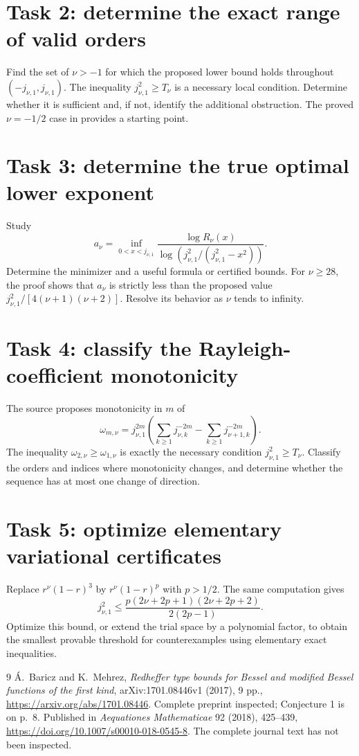 \documentclass[11pt]{article}
\begin{document}
\section*{Task 2: determine the exact range of valid orders}
Find the set of \(\nu>-1\) for which the proposed lower bound
holds throughout \((-j_{\nu,1},j_{\nu,1})\).
The inequality \(j_{\nu,1}^2\ge T_\nu\) is a necessary local condition.
Determine whether it is sufficient and, if not, identify the
additional obstruction. The proved \(\nu=-1/2\) case in \cite{BM}
provides a starting point.

\section*{Task 3: determine the true optimal lower exponent}
Study
\[
 a_\nu=\inf_{0<x<j_{\nu,1}}
 \frac{\log R_\nu(x)}
      {\log(j_{\nu,1}^2/(j_{\nu,1}^2-x^2))}.
\]
Determine the minimizer and a useful formula or certified bounds.
For \(\nu\ge28\), the proof shows that \(a_\nu\) is strictly less
than the proposed value \(j_{\nu,1}^2/[4(\nu+1)(\nu+2)]\).
Resolve its behavior as \(\nu\) tends to infinity.

\section*{Task 4: classify the Rayleigh-coefficient monotonicity}
The source proposes monotonicity in \(m\) of
\[
 \omega_{m,\nu}=j_{\nu,1}^{2m}
   \left(\sum_{k\ge1}j_{\nu,k}^{-2m}
               -\sum_{k\ge1}j_{\nu+1,k}^{-2m}\right).
\]
The inequality \(\omega_{2,\nu}\ge\omega_{1,\nu}\) is exactly the
necessary condition \(j_{\nu,1}^2\ge T_\nu\).
Classify the orders and indices where monotonicity changes, and
determine whether the sequence has at most one change of direction.

\section*{Task 5: optimize elementary variational certificates}
Replace \(r^\nu(1-r)^3\) by \(r^\nu(1-r)^p\) with \(p>1/2\).
The same computation gives
\[
 j_{\nu,1}^2\le
 \frac{p(2\nu+2p+1)(2\nu+2p+2)}{2(2p-1)}.
\]
Optimize this bound, or extend the trial space by a polynomial
factor, to obtain the smallest provable threshold for counterexamples
using elementary exact inequalities.

\begin{thebibliography}{9}
\'A.~Baricz and K.~Mehrez,
\emph{Redheffer type bounds for Bessel and modified Bessel functions
of the first kind}, arXiv:1701.08446v1 (2017), 9 pp.,
\url{https://arxiv.org/abs/1701.08446}.
Complete preprint inspected; Conjecture 1 is on p.~8.
Published in \emph{Aequationes Mathematicae} 92 (2018), 425--439,
\url{https://doi.org/10.1007/s00010-018-0545-8}.
The complete journal text has not been inspected.
\end{thebibliography}
\end{document}
